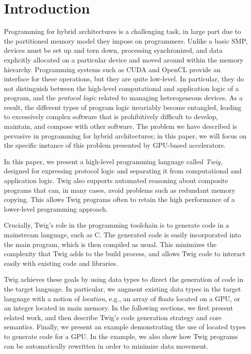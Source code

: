 
\section{Introduction}

Programming for hybrid architectures is a challenging task, in large part due to the partitioned memory model they impose on programmers. Unlike a basic SMP, devices must be set up and torn down, processing synchronized, and data explicitly allocated on a particular device and moved around within the memory hierarchy. Programming systems such as CUDA\cite{cuda} and OpenCL\cite{opencl} provide an interface for these operations, but they are quite low-level. In particular, they do not distinguish between the high-level computational and application logic of a program, and the \emph{protocol logic} related to managing heterogeneous devices. As a result, the different types of program logic invariably become entangled, leading to excessively complex software that is prohibitively difficult to develop, maintain, and compose with other software. The problem we have described is pervasive in programming for hybrid architectures; in this paper, we will focus on the specific instance of this problem presented by GPU-based accelerators.

In this paper, we present a high-level programming language called \emph{Twig}, designed for expressing protocol logic and separating it from computational and application logic. Twig also  supports automated reasoning about composite programs that can, in many cases, avoid problems such as redundant memory copying. This allows Twig programs often to retain the high performance of a lower-level programming approach.

Crucially, Twig's role in the programming toolchain is to generate code in a mainstream language, such as C. The generated code is easily incorporated into the main program, which is then compiled as usual. This minimizes the complexity that Twig adds to the build process, and allows Twig code to interact easily with existing code and libraries.

Twig achieves these goals by using data types to direct the generation of code in the target language. In particular, we augment existing data types in the target language with a notion of \emph{location}, e.g., an array of floats located on a GPU, or an integer located in main memory. In the following sections, we first present related work, and then describe Twig's code generation strategy and core semantics. Finally, we present an example demonstrating the use of located types to generate code for a GPU. In the example, we also show how Twig programs can be automatically rewritten in order to minimize data movement.
